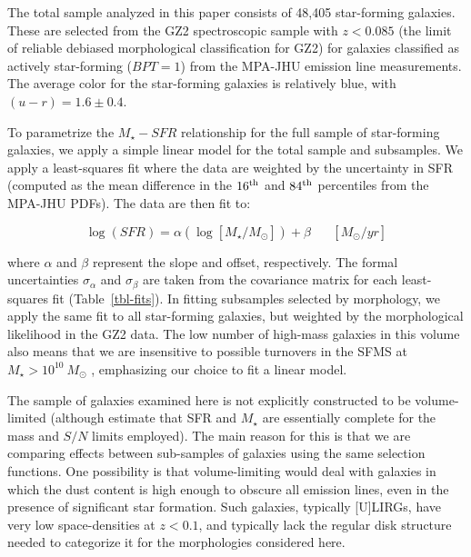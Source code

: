 \documentclass[useAMS,usenatbib]{mn2e}
\begin{document}
The total sample analyzed in this paper consists of 48,405 star-forming galaxies. These are selected from the GZ2 spectroscopic sample with $z<0.085$ (the limit of reliable debiased morphological classification for GZ2) for galaxies classified as actively star-forming ($BPT=1$) from the MPA-JHU emission line measurements. The average color for the star-forming galaxies is relatively blue, with $(u-r)=1.6\pm0.4$. 

To parametrize the $M_\star-SFR$ relationship for the full sample of star-forming galaxies, we apply a simple linear model for the total sample and subsamples. We apply a least-squares fit where the data are weighted by the uncertainty in SFR (computed as the mean difference in the $16^{\rm th}$ and $84^{\rm th}$ percentiles from the MPA-JHU PDFs). The data are then fit to:

\begin{equation}
\log(SFR) = \alpha(\log[M_\star/M_\odot]) + \beta \hspace{20pt}[M_\odot/yr]
\label{eqn-linearfit}
\end{equation}

\noindent where $\alpha$ and $\beta$ represent the slope and offset, respectively. The formal uncertainties $\sigma_\alpha$ and $\sigma_\beta$ are taken from the covariance matrix for each least-squares fit (Table~\ref{tbl-fits}). In fitting subsamples selected by morphology, we apply the same fit to all star-forming galaxies, but weighted by the morphological likelihood in the GZ2 data. The low number of high-mass galaxies in this volume also means that we are insensitive to possible turnovers in the SFMS at $M_\star>10^{10}~M_\odot$ \citep{whi14,lee15}, emphasizing our choice to fit a linear model. 


The sample of galaxies examined here is not explicitly constructed to be volume-limited (although \citealt{bri04} estimate that SFR and $M_\star$ are essentially complete for the mass and $S/N$ limits employed). The main reason for this is that we are comparing effects between sub-samples of galaxies using the same selection functions. One possibility is that volume-limiting would deal with galaxies in which the dust content is high enough to obscure all emission lines, even in the presence of significant star formation. Such galaxies, typically [U]LIRGs, have very low space-densities at $z<0.1$, and typically lack the regular disk structure needed to categorize it for the morphologies considered here.  
\end{document}
